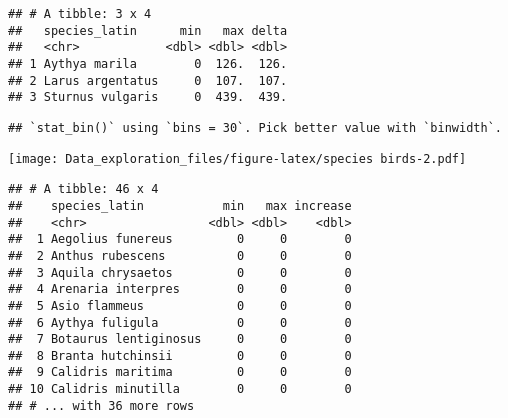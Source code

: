 \documentclass[]{article}
\newenvironment{Shaded}{\begin{snugshade}}{\end{snugshade}}
\newcommand{\KeywordTok}[1]{\textcolor[rgb]{0.13,0.29,0.53}{\textbf{#1}}}
\newcommand{\DataTypeTok}[1]{\textcolor[rgb]{0.13,0.29,0.53}{#1}}
\newcommand{\DecValTok}[1]{\textcolor[rgb]{0.00,0.00,0.81}{#1}}
\newcommand{\StringTok}[1]{\textcolor[rgb]{0.31,0.60,0.02}{#1}}
\newcommand{\CommentTok}[1]{\textcolor[rgb]{0.56,0.35,0.01}{\textit{#1}}}
\newcommand{\OperatorTok}[1]{\textcolor[rgb]{0.81,0.36,0.00}{\textbf{#1}}}
\newcommand{\NormalTok}[1]{#1}
\begin{document}
\begin{verbatim}
## # A tibble: 3 x 4
##   species_latin      min   max delta
##   <chr>            <dbl> <dbl> <dbl>
## 1 Aythya marila        0  126.  126.
## 2 Larus argentatus     0  107.  107.
## 3 Sturnus vulgaris     0  439.  439.
\end{verbatim}

\begin{Shaded}
\end{Shaded}

\begin{verbatim}
## `stat_bin()` using `bins = 30`. Pick better value with `binwidth`.
\end{verbatim}

\texttt{[image: Data\_exploration\_files/figure-latex/species birds-2.pdf]}

\begin{Shaded}
\end{Shaded}

\begin{verbatim}
## # A tibble: 46 x 4
##    species_latin           min   max increase
##    <chr>                 <dbl> <dbl>    <dbl>
##  1 Aegolius funereus         0     0        0
##  2 Anthus rubescens          0     0        0
##  3 Aquila chrysaetos         0     0        0
##  4 Arenaria interpres        0     0        0
##  5 Asio flammeus             0     0        0
##  6 Aythya fuligula           0     0        0
##  7 Botaurus lentiginosus     0     0        0
##  8 Branta hutchinsii         0     0        0
##  9 Calidris maritima         0     0        0
## 10 Calidris minutilla        0     0        0
## # ... with 36 more rows
\end{verbatim}
\end{document}
